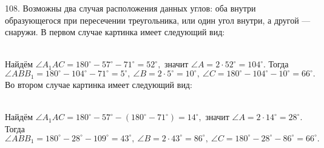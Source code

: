 108. Возможны два случая расположения данных углов: оба внутри образующегося при пересечении треугольника, или один угол внутри, а другой --- снаружи. В первом случае картинка имеет следующий вид:
\begin{figure}[ht!]
\end{figure}\\
Найдём $\angle A_1AC=180^\circ-57^\circ-71^\circ=52^\circ,$ значит $\angle A=2\cdot52^\circ=104^\circ.$ Тогда $\angle ABB_1=180^\circ-104^\circ-71^\circ=5^\circ,\ \angle B=2\cdot5^\circ=10^\circ,\ \angle C=180^\circ-104^\circ-10^\circ=66^\circ.$\\
Во втором случае картинка имеет следующий вид:\\
\begin{figure}[ht!]
\end{figure}\\
Найдём $\angle A_1AC=180^\circ-57^\circ-(180^\circ-71^\circ)=14^\circ,$ значит $\angle A=2\cdot14^\circ=28^\circ.$ Тогда $\angle ABB_1=180^\circ-28^\circ-109^\circ=43^\circ,\ \angle B=2\cdot43^\circ=86^\circ,\ \angle C=180^\circ-28^\circ-86^\circ=66^\circ.$\\
